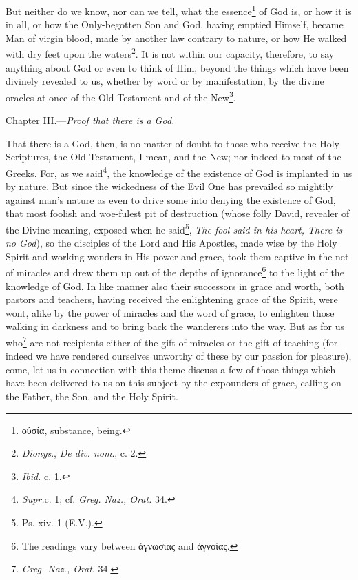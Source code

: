 But neither do we know, nor can we tell, what the essence\footnote{\textgreek{οὐσία}, substance, being.} of God is, or how it is in all, or how the Only-begotten Son and God, having emptied Himself, became Man of virgin blood, made by another law contrary to nature, or how He walked with dry feet upon the waters\footnote{\emph{Dionys}., \emph{De div. nom}., c. 2.}. It is not within our capacity, therefore, to say anything about God or even to think of Him, beyond the things which have been divinely revealed to us, whether by word or by manifestation, by the divine oracles at once of the Old Testament and of the New\footnote{\emph{Ibid. }c. 1.}.


Chapter III.—\emph{Proof that there is a God.}

That there is a God, then, is no matter of doubt to those who receive the Holy Scriptures, the Old Testament, I mean, and the New; nor indeed to most of the Greeks. For, as we said\footnote{\emph{Supr.}c. 1; cf. \emph{Greg. Naz., Orat. }34.}, the knowledge of the existence of God is implanted in us by nature. But since the wickedness of the Evil One has prevailed so mightily against man’s nature as even to drive some into denying the existence of God, that most foolish and woe-fulest pit of destruction (whose folly David, revealer of the Divine meaning, exposed when he said\footnote{Ps. xiv. 1 (E.V.).}, \emph{The fool said in his heart, There is no God}), so the disciples of the Lord and His Apostles, made wise by the Holy Spirit and working wonders in His power and grace, took them captive in the net of miracles and drew them up out of the depths of ignorance\footnote{The readings vary between \textgreek{ἀγνωσίας} and \textgreek{ἀγνοίας}.} to the light of the knowledge of God. In like manner also their successors in grace and worth, both pastors and teachers, having received the enlightening grace of the Spirit, were wont, alike by the power of miracles and the word of grace, to enlighten those walking in darkness and to bring back the wanderers into the way. But as for us who\footnote{\emph{Greg. Naz., Orat}. 34.} are not recipients either of the gift of miracles or the gift of teaching (for indeed we have rendered ourselves unworthy of these by our passion for pleasure), come, let us in connection with this theme discuss a few of those things which have been delivered to us on this subject by the expounders of grace, calling on the Father, the Son, and the Holy Spirit.

